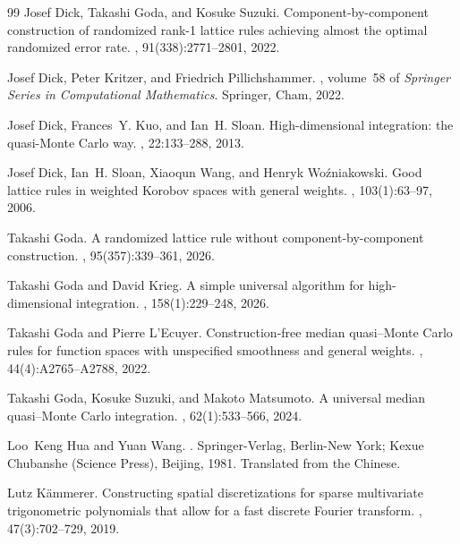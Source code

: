 \documentclass[a4paper,11pt]{article}
\begin{document}
\begin{thebibliography}{99}
Josef Dick, Takashi Goda, and Kosuke Suzuki.
\newblock Component-by-component construction of randomized rank-1 lattice
  rules achieving almost the optimal randomized error rate.
, 91(338):2771--2801, 2022.

Josef Dick, Peter Kritzer, and Friedrich Pillichshammer.
, volume~58 of {\em Springer Series in Computational
  Mathematics}.
\newblock Springer, Cham, 2022.

Josef Dick, Frances~Y. Kuo, and Ian~H. Sloan.
\newblock High-dimensional integration: the quasi-{M}onte {C}arlo way.
, 22:133--288, 2013.

Josef Dick, Ian~H. Sloan, Xiaoqun Wang, and Henryk Wo\'zniakowski.
\newblock Good lattice rules in weighted {K}orobov spaces with general weights.
, 103(1):63--97, 2006.

Takashi Goda.
\newblock A randomized lattice rule without component-by-component
  construction.
, 95(357):339--361, 2026.

Takashi Goda and David Krieg.
\newblock A simple universal algorithm for high-dimensional integration.
, 158(1):229--248, 2026.

Takashi Goda and Pierre L'Ecuyer.
\newblock Construction-free median quasi--{M}onte {C}arlo rules for function
  spaces with unspecified smoothness and general weights.
, 44(4):A2765--A2788, 2022.

Takashi Goda, Kosuke Suzuki, and Makoto Matsumoto.
\newblock A universal median quasi--{M}onte {C}arlo integration.
, 62(1):533--566, 2024.

Loo~Keng Hua and Yuan Wang.
.
\newblock Springer-Verlag, Berlin-New York; Kexue Chubanshe (Science Press),
  Beijing, 1981.
\newblock Translated from the Chinese.

Lutz K\"{a}mmerer.
\newblock Constructing spatial discretizations for sparse multivariate
  trigonometric polynomials that allow for a fast discrete {F}ourier transform.
, 47(3):702--729, 2019.


\end{thebibliography}
\end{document}
